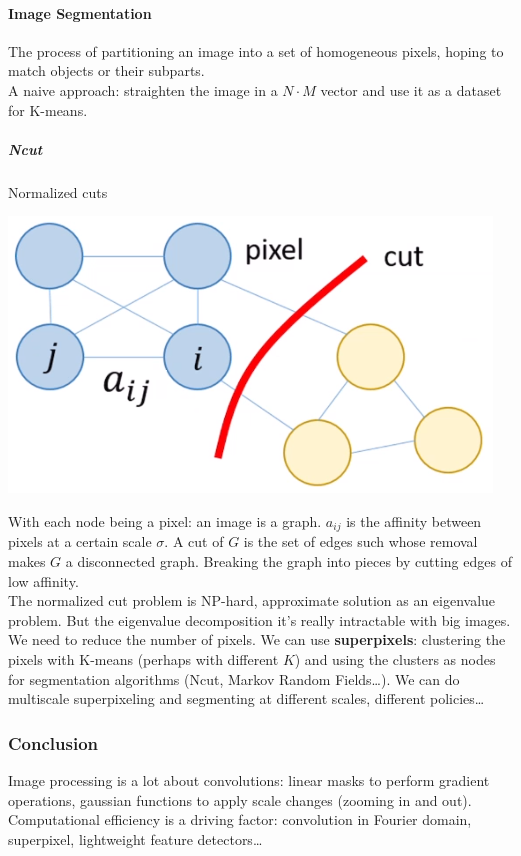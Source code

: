 \documentclass[10pt]{report}
\begin{document}
\paragraph{Image Segmentation} The process of partitioning an image into a set of homogeneous pixels, hoping to match objects or their subparts.\\
A naive approach: straighten the image in a $N\cdot M$ vector and use it as a dataset for K-means.\\
\subparagraph{Ncut} Normalized cuts
\begin{center}
	\includegraphics[scale=0.5]{9.png}
\end{center}
With each node being a pixel: an image is a graph. $a_{ij}$ is the affinity between pixels at a certain scale $\sigma$. A cut of $G$ is the set of edges such whose removal makes $G$ a disconnected graph. Breaking the graph into pieces by cutting edges of low affinity.\\
The normalized cut problem is NP-hard, approximate solution as an eigenvalue problem. But the eigenvalue decomposition it's really intractable with big images. We need to reduce the number of pixels. We can use \textbf{superpixels}: clustering the pixels with K-means (perhaps with different $K$) and using the clusters as nodes for segmentation algorithms (Ncut, Markov Random Fields\ldots). We can do multiscale superpixeling and segmenting at different scales, different policies\ldots
\subsubsection{Conclusion}
Image processing is a lot about convolutions: linear masks to perform gradient operations, gaussian functions to apply scale changes (zooming in and out). Computational efficiency is a driving factor: convolution in Fourier domain, superpixel, lightweight feature detectors\ldots
\end{document}
